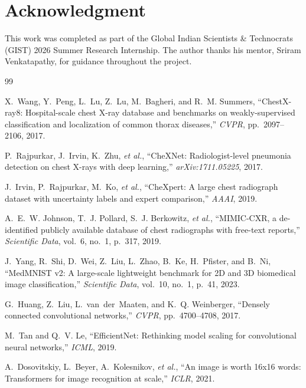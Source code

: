 \documentclass[conference]{IEEEtran}
\begin{document}
\section*{Acknowledgment}
This work was completed as part of the Global Indian Scientists \& Technocrats
(GIST) 2026 Summer Research Internship. The author thanks his mentor, Sriram
Venkatapathy, for guidance throughout the project.

\begin{thebibliography}{99}
\footnotesize
\setlength{\itemsep}{0pt}

X.~Wang, Y.~Peng, L.~Lu, Z.~Lu, M.~Bagheri, and R.~M. Summers,
``ChestX-ray8: Hospital-scale chest X-ray database and benchmarks on
weakly-supervised classification and localization of common thorax diseases,''
\emph{CVPR}, pp.~2097--2106, 2017.

P.~Rajpurkar, J.~Irvin, K.~Zhu, \emph{et al.},
``CheXNet: Radiologist-level pneumonia detection on chest X-rays with deep
learning,'' \emph{arXiv:1711.05225}, 2017.

J.~Irvin, P.~Rajpurkar, M.~Ko, \emph{et al.},
``CheXpert: A large chest radiograph dataset with uncertainty labels and expert
comparison,'' \emph{AAAI}, 2019.

A.~E.~W. Johnson, T.~J. Pollard, S.~J. Berkowitz, \emph{et al.},
``MIMIC-CXR, a de-identified publicly available database of chest radiographs with
free-text reports,'' \emph{Scientific Data}, vol.~6, no.~1, p.~317, 2019.

J.~Yang, R.~Shi, D.~Wei, Z.~Liu, L.~Zhao, B.~Ke, H.~Pfister, and B.~Ni,
``MedMNIST v2: A large-scale lightweight benchmark for 2D and 3D biomedical image
classification,'' \emph{Scientific Data}, vol.~10, no.~1, p.~41, 2023.

G.~Huang, Z.~Liu, L.~van~der~Maaten, and K.~Q. Weinberger,
``Densely connected convolutional networks,'' \emph{CVPR}, pp.~4700--4708, 2017.

M.~Tan and Q.~V. Le,
``EfficientNet: Rethinking model scaling for convolutional neural networks,''
\emph{ICML}, 2019.

A.~Dosovitskiy, L.~Beyer, A.~Kolesnikov, \emph{et al.},
``An image is worth 16x16 words: Transformers for image recognition at scale,''
\emph{ICLR}, 2021.


\end{thebibliography}
\end{document}
